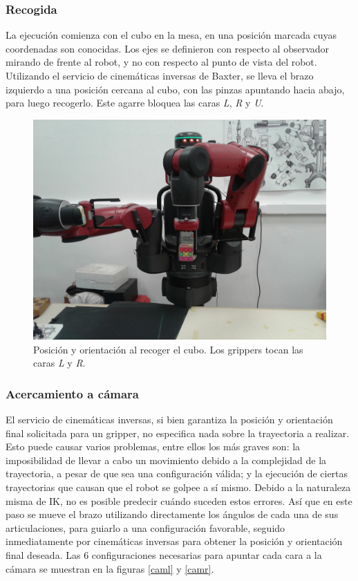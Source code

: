 \subsubsection{Recogida}
La ejecución comienza con el cubo en la mesa, en una posición marcada cuyas coordenadas son conocidas. Los ejes se definieron con respecto al observador mirando de frente al robot, y no con respecto al punto de vista del robot. Utilizando el servicio de cinemáticas inversas de Baxter, se lleva el brazo izquierdo a una posición cercana al cubo, con las pinzas apuntando hacia abajo, para luego recogerlo. Este agarre bloquea las caras \textit{L}, \textit{R} y \textit{U}.

\begin{figure}[h!]
	\centering
	\includegraphics[scale=0.1]{figures/pick}
	\caption[Posición y orientación al recoger el cubo.]{Posición y orientación al recoger el cubo. Los grippers tocan las caras \textit{L} y \textit{R}.}
	\label{pick}
\end{figure}

\subsubsection{Acercamiento a cámara}
El servicio de cinemáticas inversas, si bien garantiza la posición y orientación final solicitada para un gripper, no especifica nada sobre la trayectoria a realizar. Esto puede causar varios problemas, entre ellos los más graves son: la imposibilidad de llevar a cabo un movimiento debido a la complejidad de la trayectoria, a pesar de que sea una configuración válida; y la ejecución de ciertas trayectorias que causan que el robot se golpee a sí mismo. Debido a la naturaleza misma de IK, no es posible predecir cuándo suceden estos errores. Así que en este paso se mueve el brazo utilizando directamente los ángulos de cada una de sus articulaciones, para guiarlo a una configuración favorable, seguido inmediatamente por cinemáticas inversas para obtener la posición y orientación final deseada. Las $6$ configuraciones necesarias para apuntar cada cara a la cámara se muestran en la figuras \ref{caml} y \ref{camr}.

